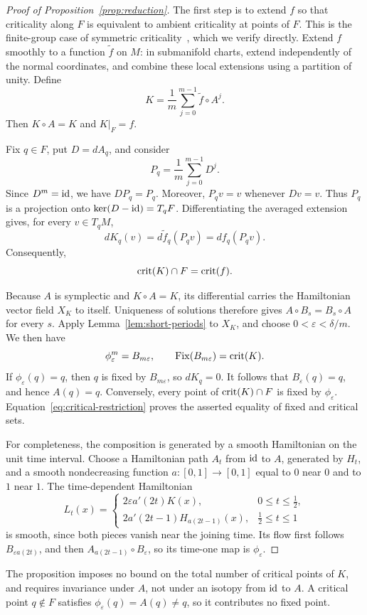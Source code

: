 \begin{proof}[Proof of Proposition~\ref{prop:reduction}]
The first step is to extend $f$ so that criticality along $F$ is equivalent
to ambient criticality at points of $F$. This is the finite-group case
of symmetric criticality~\cite{Palais1979}, which we verify directly.
Extend \(f\) smoothly to a function \(\widetilde f\) on \(M\): in
submanifold charts, extend independently of the normal coordinates,
and combine these local extensions using a partition of unity. Define
\[
  K=\frac1m\sum_{j=0}^{m-1}\widetilde f\circ A^j.
\]
Then \(K\circ A=K\) and \(K|_F=f\).

Fix \(q\in F\), put \(D=dA_q\), and consider
\[
  P_q=\frac1m\sum_{j=0}^{m-1}D^j.
\]
Since \(D^m=\mathrm{id}\), we have \(DP_q=P_q\). Moreover, \(P_qv=v\) whenever
\(Dv=v\). Thus \(P_q\) is a projection onto
\(\ker(D-\mathrm{id})=T_qF\). Differentiating the averaged extension gives,
for every \(v\in T_qM\),
\[
  dK_q(v)=d\widetilde f_q(P_qv)=df_q(P_qv).
\]
Consequently,
\begin{equation}
\label{eq:critical-restriction}
  \operatorname{crit}(K)\cap F=\operatorname{crit}(f).
\end{equation}

Because \(A\) is symplectic and \(K\circ A=K\), its differential carries
the Hamiltonian vector field \(X_K\) to itself. Uniqueness of solutions
therefore gives \(A\circ B_s=B_s\circ A\) for every \(s\). Apply
Lemma~\ref{lem:short-periods} to \(X_K\), and choose
\(0<\varepsilon<\delta/m\). We then have
\[
  \phi_\varepsilon^m=B_{m\varepsilon},
  \qquad
  \operatorname{Fix}(B_{m\varepsilon})=\operatorname{crit}(K).
\]
If \(\phi_\varepsilon(q)=q\), then \(q\) is fixed by
\(B_{m\varepsilon}\), so \(dK_q=0\). It follows that
\(B_\varepsilon(q)=q\), and hence \(A(q)=q\). Conversely, every point
of \(\operatorname{crit}(K)\cap F\) is fixed by \(\phi_\varepsilon\).
Equation~\ref{eq:critical-restriction} proves the asserted equality
of fixed and critical sets.

For completeness, the composition is generated by a smooth
Hamiltonian on the unit time interval. Choose a Hamiltonian path
\(A_t\) from \(\mathrm{id}\) to \(A\), generated by \(H_t\), and a smooth
nondecreasing function \(a:[0,1]\to[0,1]\) equal to \(0\) near \(0\)
and to \(1\) near \(1\). The time-dependent Hamiltonian
\[
  L_t(x)=
  \begin{cases}
    2\varepsilon a'(2t)K(x),&0\le t\le\tfrac12,\\[2pt]
    2a'(2t-1)H_{a(2t-1)}(x),&\tfrac12\le t\le1
  \end{cases}
\]
is smooth, since both pieces vanish near the joining time. Its flow
first follows \(B_{\varepsilon a(2t)}\), and then
\(A_{a(2t-1)}\circ B_\varepsilon\), so its time-one map is
\(\phi_\varepsilon\).
\end{proof}

The proposition imposes no bound on the total number of critical
points of \(K\), and requires invariance under $A$, not under an isotopy
from $\mathrm{id}$ to $A$. A critical point \(q\notin F\) satisfies
\(\phi_\varepsilon(q)=A(q)\ne q\), so it contributes no fixed point.
